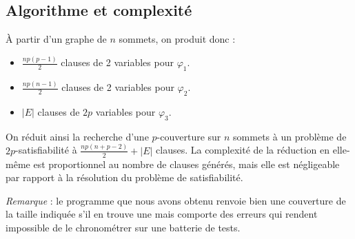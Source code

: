 \documentclass[a4paper,10pt]{article}
\newcommand*{\itemb}{\item[$\bullet$]}
\begin{document}
\subsection{Algorithme et complexité}

À partir d'un graphe de $n$ sommets, on produit donc :
\begin{itemize}
 \itemb $\frac{np(p-1)}2$ clauses de 2 variables pour $\varphi_1$.
 \itemb $\frac{np(n-1)}2$ clauses de 2 variables pour $\varphi_2$.
 \itemb $|E|$ clauses de $2p$ variables pour $\varphi_3$.
\end{itemize}

On réduit ainsi la recherche d'une $p$-couverture sur $n$ sommets à un problème de $2p$-satisfiabilité à $\frac {np (n+p-2)}2 +|E|$ clauses. La complexité de la réduction en elle-même est proportionnel au nombre de clauses générés, mais elle est négligeable par rapport à la résolution du problème de satisfiabilité.

\vspace{0.35cm}
\emph{Remarque} : le programme que nous avons obtenu renvoie bien une couverture de la taille indiquée s'il en trouve une mais comporte des erreurs qui rendent impossible de le chronométrer sur une batterie de tests.
\end{document}
